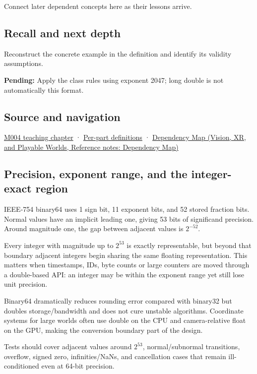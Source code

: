 Connect later dependent concepts here as their lessons arrive.

\subsection{Recall and next depth}\label{appendix-5078dfab64e6-recall-and-next-depth}

\hypertarget{appendix-5078dfab64e6-recall-and-next-depth}{}

Reconstruct the concrete example in the definition and identify its validity assumptions.

\textbf{Pending:} Apply the class rules using exponent 2047; long double is not automatically this format.

\subsection{Source and navigation}\label{appendix-5078dfab64e6-source-and-navigation}

\hypertarget{appendix-5078dfab64e6-source-and-navigation}{}

\hyperref[01-foundations-i-ch001-a-stretching-ruler-for-real-valued-quantities]{M004 teaching chapter} · \hyperref[appendix-fd090d982a15-m004---parts-61-76]{Per-part definitions} · \href{../07-Vision-XR-and-Playable-Worlds/main.pdf\#nameddest=appendix-4ad47bdd269a}{Dependency Map (Vision, XR, and Playable Worlds, Reference notes: Dependency Map)}

\subsection{Precision, exponent range, and the integer-exact region}\label{appendix-5078dfab64e6-precision-exponent-range-and-the-integer-exact-region}

\hypertarget{appendix-5078dfab64e6-precision-exponent-range-and-the-integer-exact-region}{}

IEEE-754 binary64 uses 1 sign bit, 11 exponent bits, and 52 stored fraction bits. Normal values have an implicit leading one, giving 53 bits of significand precision. Around magnitude one, the gap between adjacent values is \(2^{-52}\).

Every integer with magnitude up to \(2^{53}\) is exactly representable, but beyond that boundary adjacent integers begin sharing the same floating representation. This matters when timestamps, IDs, byte counts or large counters are moved through a double-based API: an integer may be within the exponent range yet still lose unit precision.

Binary64 dramatically reduces rounding error compared with binary32 but doubles storage/bandwidth and does not cure unstable algorithms. Coordinate systems for large worlds often use double on the CPU and camera-relative float on the GPU, making the conversion boundary part of the design.

Tests should cover adjacent values around \(2^{53}\), normal/subnormal transitions, overflow, signed zero, infinities/NaNs, and cancellation cases that remain ill-conditioned even at 64-bit precision.
